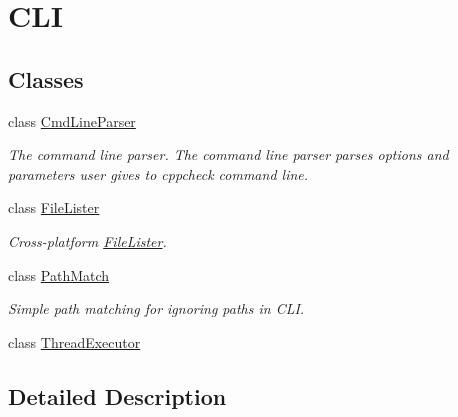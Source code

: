 \hypertarget{group___c_l_i}{\section{C\-L\-I}
\label{group___c_l_i}
}
\subsection*{Classes}
\begin{DoxyCompactItemize}
\item 
class \hyperlink{class_cmd_line_parser}{Cmd\-Line\-Parser}
\begin{DoxyCompactList}\small\item\em The command line parser. The command line parser parses options and parameters user gives to cppcheck command line. \end{DoxyCompactList}\item 
class \hyperlink{class_file_lister}{File\-Lister}
\begin{DoxyCompactList}\small\item\em Cross-\/platform \hyperlink{class_file_lister}{File\-Lister}. \end{DoxyCompactList}\item 
class \hyperlink{class_path_match}{Path\-Match}
\begin{DoxyCompactList}\small\item\em Simple path matching for ignoring paths in C\-L\-I. \end{DoxyCompactList}\item 
class \hyperlink{class_thread_executor}{Thread\-Executor}
\end{DoxyCompactItemize}


\subsection{Detailed Description}
